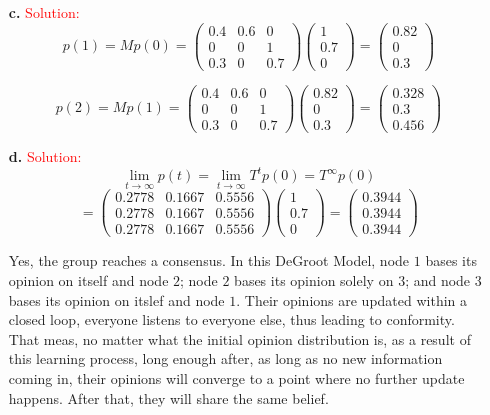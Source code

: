 \documentclass[11pt]{article} %
\begin{document}
\begin{itemize}
\item[\textbf{c. }] 
\textcolor{red}{Solution:}
$$p(1)=Mp(0)=\left(  \begin{array}{ccc}
0.4 & 0.6 & 0 \\
0 & 0 & 1  \\
0.3 &  0  & 0.7   \end{array}\right) 
\left( \begin{array}{c}
1 \\
0.7 \\
0
\end{array}\right) =
\left( \begin{array}{c}
0.82 \\
0 \\
0.3
\end{array}\right)  $$

$$p(2)=Mp(1)=\left(  \begin{array}{ccc}
0.4 & 0.6 & 0 \\
0 & 0 & 1  \\
0.3 &  0  & 0.7   \end{array}\right) 
\left( \begin{array}{c}
0.82 \\
0 \\
0.3
\end{array}\right) =
\left( \begin{array}{c}
0.328 \\
0.3 \\
0.456
\end{array}\right)  $$


\item[\textbf{d. }] 
\textcolor{red}{Solution:}
$$ \lim_{t\to \infty} p(t)=\lim_{t\to \infty} T^t p(0)= T^{\infty} p(0)$$
$$=\left(  \begin{array}{ccc}
0.2778 & 0.1667 & 0.5556 \\
0.2778 & 0.1667 & 0.5556 \\
0.2778 & 0.1667 & 0.5556  \end{array}\right) 
\left( \begin{array}{c}
1 \\
0.7 \\
0
\end{array}\right) =
\left( \begin{array}{c}
0.3944 \\
0.3944\\
0.3944
\end{array}\right)$$

Yes, the group reaches a consensus. In this DeGroot Model, node $1$ bases its opinion on itself and node $2$; node $2$ bases its opinion solely on $3$; and node $3$ bases its opinion on itslef and node $1$. Their opinions are updated within a closed loop, everyone listens to everyone else, thus leading to conformity. That meas, no matter what the initial opinion distribution is, as a result of this learning process, long enough after, as long as no new information coming in, their opinions will converge to a point where no further update happens. After that, they will share the same belief.



\end{itemize}
\end{document}
